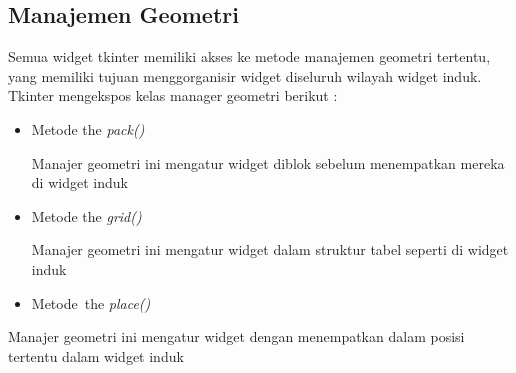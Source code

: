 \documentclass{wileySix}
\begin{document}
\begin{myEnumerate}
\begin{myEnumerate}
{\begin{myEnumerate}
\section{Manajemen Geometri}
 \par
\noindent 
\hspace*{0.5in} Semua widget tkinter memiliki akses ke metode manajemen geometri tertentu, yang memiliki tujuan menggorganisir widget diseluruh wilayah widget induk. Tkinter mengekspos kelas manager geometri berikut : \par
\noindent 
\begin{itemize}
	\item Metode the \textit{pack()} \par
	\noindent 
	Manajer geometri ini mengatur widget diblok sebelum menempatkan mereka di widget induk \par
	\noindent 
	\item Metode the \textit{grid()} \par
	\noindent 
	Manajer geometri ini mengatur widget dalam struktur tabel seperti di widget induk \par
	\noindent 
	\item Metode~the  \textit{place()}\end{itemize}
\par
\noindent 
Manajer geometri ini mengatur widget dengan menempatkan dalam posisi tertentu dalam widget induk \par
\vspace{12pt}


\end{myEnumerate}}
\end{myEnumerate}
\end{myEnumerate}
\end{document}
